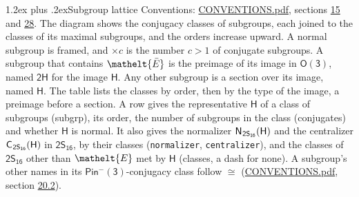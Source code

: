 \documentclass[10pt,a4paper]{article}
\makeatletter
\renewcommand\section{\@startsection{section}{1}{\z@}{-3ex plus -1ex minus -.2ex}%
  {1.2ex plus .2ex}{\normalfont\large\sffamily\bfseries\color{parttitle}}}
\numberwithin{equation}{section}
\newcommand{\eltfont}[1]{{\let\sigma\eltsigma\mathelt{#1}}}
\newcommand{\grp}[1]{\mathsf{#1}}
\newcommand{\cls}[1]{\eltfont{#1}}
\newcommand{\elt}[1]{\eltfont{#1}}
\newcommand{\samecls}{\cong}
\newcommand{\barred}[1]{\bar{#1}}
\newcommand{\hairsp}{\mkern1mu}
\makeatother
\begin{document}
\section{Subgroup lattice}\label{s:subgroups}
Conventions: \href{../../CONVENTIONS.pdf}{CONVENTIONS.pdf}, sections \href{../../../rotation/CONVENTIONS.pdf\#conv.15}{15} and \href{../../CONVENTIONS.pdf\#conv.28}{28}.
The diagram shows the conjugacy classes of subgroups, each joined to the classes of its maximal subgroups, and the orders increase upward. \label{n:index.conjugates.c}A normal subgroup is framed, and ${\times}c$ is the number $c > 1$ of conjugate subgroups. \label{n:group.H}A subgroup that contains $\elt{\barred{E}}$ is the preimage of its image in $\grp{O(3)}$, named $\grp{2H}$ for the image $\grp{H}$. Any other subgroup is a section over its image, named $\grp{H}$. The table lists the classes by order, then by the type of the image, a preimage before a section. \label{n:head.subgroup}\label{n:head.order}\label{n:head.conjugates}\label{n:head.normal}A row gives the representative $\grp{H}$ of a class of subgroups (subgrp), its order, the number of subgroups in the class (conjugates) and whether $\grp{H}$ is normal. \label{n:group.normalizer}\label{n:group.centralizer}\label{n:head.classes}It also gives the normalizer $\grp{N}_{\hairsp \grp{2S_{16}}}(\grp{H})$ and the centralizer $\grp{C}_{\hairsp \grp{2S_{16}}}(\grp{H})$ in $\grp{2S_{16}}$, by their classes (\texttt{normalizer}, \texttt{centralizer}), and the classes of $\grp{2S_{16}}$ other than $\cls{E}$ met by $\grp{H}$ (classes, a dash for none). A subgroup's other names in its \href{Pinminus3.pdf}{$\grp{Pin^{-}(3)}$}-conjugacy class follow $\samecls$ (\href{../../CONVENTIONS.pdf}{CONVENTIONS.pdf}, section \href{../../CONVENTIONS.pdf\#conv.20.2}{20.2}).
\begin{center}
\end{center}
\end{document}
